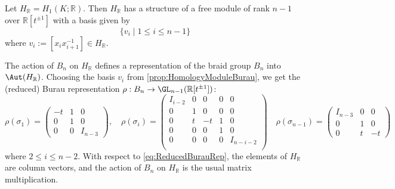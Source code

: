 \documentclass{amsart}
\begin{document}
\begin{prop}
    \label{prop:HomologyModuleBurau}
    Let $H_{\mathbb{R}} = H_1(K;\mathbb{R})$. Then $H_{\mathbb{R}}$ has a structure of a free module of rank $n-1$ over $\mathbb{R}[t^{\pm 1}]$ with a basis given by
    \[\{ v_{i} \mid 1 \leq i \leq n-1\}\]
    where $v_{i} := [x_ix_{i+1}^{-1}] \in H_\mathbb{R}$. 
\end{prop}

The action of $B_n$ on $H_{\mathbb{R}}$ defines a representation of the braid group $B_n$ into $\Aut(H_\mathbb{R})$. Choosing the basis $v_i$ from \cref{prop:HomologyModuleBurau}, we get the (reduced) Burau representation $\rho: B_n \to \GL_{n-1}(\mathbb{R}[t^{\pm 1}])$:
\begin{equation}\label{eq:ReducedBurauRep}
    \rho(\sigma_1) = \begin{pmatrix}
        -t & 1 & 0 \\
        0 &  1 &0  \\
        0& 0& I_{n-3}
    \end{pmatrix}, \quad \rho(\sigma_i) = \begin{pmatrix}
        I_{i-2} & 0 & 0 & 0 & 0 \\
        0 & 1 & 0 & 0 & 0 \\
        0 & t & -t & 1 & 0 \\
        0 & 0 & 0 & 1 & 0 \\
        0 & 0 & 0 & 0 & I_{n-i-2} \\
    \end{pmatrix} \quad  \rho(\sigma_{n-1}) = \begin{pmatrix}
        I_{n-3} &0  & 0 \\
       0  &  1 & 0  \\
       0 & t & -t
    \end{pmatrix}
\end{equation}
where $2\leq i \leq n-2$. With respect to \cref{eq:ReducedBurauRep}, the elements of $H_\mathbb{R}$ are column vectors, and the action of $B_n$ on $H_\mathbb{R}$ is the usual matrix multiplication. 
\end{document}
